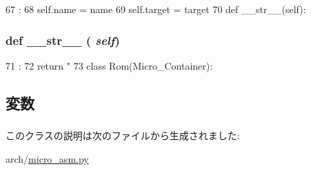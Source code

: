 \begin{DoxyCode}
67                                     :
68         self.name = name
69         self.target = target
70 
    def __str__(self):
\end{DoxyCode}
\hypertarget{classmicro__asm_1_1Rom__Macroop_aa7a4b9bc0941308e362738503137460e}{
\subsubsection[{\_\-\_\-str\_\-\_\-}]{\setlength{\rightskip}{0pt plus 5cm}def \_\-\_\-str\_\-\_\- ( {\em self})}}
\label{classmicro__asm_1_1Rom__Macroop_aa7a4b9bc0941308e362738503137460e}



\begin{DoxyCode}
71                      :
72         return "%
73 
class Rom(Micro_Container):
\end{DoxyCode}


\subsection{変数}
\hypertarget{classmicro__asm_1_1Rom__Macroop_ab74e6bf80237ddc4109968cedc58c151}{
\subsubsection[{name}]{}}
\label{classmicro__asm_1_1Rom__Macroop_ab74e6bf80237ddc4109968cedc58c151}
\hypertarget{classmicro__asm_1_1Rom__Macroop_a5d2c023108742a1ce78ba9823c06ea35}{
\subsubsection[{target}]{}}
\label{classmicro__asm_1_1Rom__Macroop_a5d2c023108742a1ce78ba9823c06ea35}


このクラスの説明は次のファイルから生成されました:\begin{DoxyCompactItemize}
\item 
arch/\hyperlink{micro__asm_8py}{micro\_\-asm.py}\end{DoxyCompactItemize}
